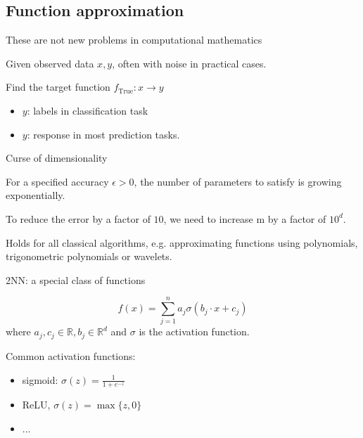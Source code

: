 \documentclass[aspectratio=32]{beamer}
\begin{document}
\subsection{Function approximation}

\begin{frame}{These are not new problems in computational mathematics}

    Given observed data $x, y$, often with noise in practical cases.

    Find the target function $f_{\text{True}}: x \to y$

    \begin{itemize}
        \item $y$: labels in classification task
        \item $y$: response in most prediction tasks.
    \end{itemize}

    \vspace{0.1\pdfpageheight}


\end{frame}

\begin{frame}{Curse of dimensionality}
    \begin{definition}
        For a specified accuracy $\epsilon > 0$, the number of parameters to
        satisfy is growing exponentially.
    \end{definition}

    To reduce the error by a factor of $10$, we need to increase m by a factor of $10^d$.

    Holds for all classical algorithms, e.g. approximating functions using
    polynomials, trigonometric polynomials or wavelets.

\end{frame}

\begin{frame}{2NN: a special class of functions}

    $$
    f(x) = \sum_{j=1}^n a_j \sigma(b_j \cdot x + c_j) 
    $$
    where $a_j, c_j \in \mathbb{R}, b_j \in \mathbb{R}^d$ and $\sigma$ is the
    activation function.

    \vspace*{3em}
    Common activation functions: 
    \begin{itemize}
        \item sigmoid: $\sigma(z) = \frac{1}{1+ e^{-z}}$
        \item ReLU, $\sigma(z)= \max\{z, 0\}$
        \item ...
    \end{itemize}
\end{frame}
\end{document}

